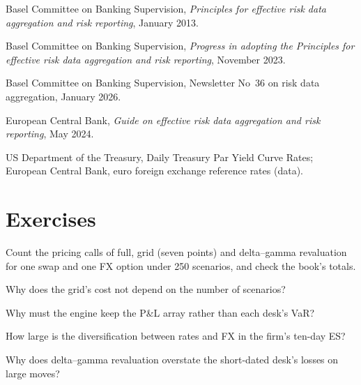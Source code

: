 \begin{omsources}
\item Basel Committee on Banking Supervision, \emph{Principles for effective risk data aggregation and risk
reporting}, January 2013.
\item Basel Committee on Banking Supervision, \emph{Progress in adopting the Principles for effective risk data
aggregation and risk reporting}, November 2023.
\item Basel Committee on Banking Supervision, Newsletter No~36 on risk data aggregation, January 2026.
\item European Central Bank, \emph{Guide on effective risk data aggregation and risk reporting}, May 2024.
\item US Department of the Treasury, Daily Treasury Par Yield Curve Rates; European Central Bank, euro foreign
exchange reference rates (data).
\end{omsources}

\section{Exercises}

\begin{exercise}[$\star$]\label{exo:rc:build-a-risk-engine:1}
Count the pricing calls of full, grid (seven points) and delta--gamma revaluation for one swap and one FX
option under 250 scenarios, and check the book's totals.
\end{exercise}

\begin{exercise}[$\star$]\label{exo:rc:build-a-risk-engine:2}
Why does the grid's cost not depend on the number of scenarios?
\end{exercise}

\begin{exercise}[$\star$]\label{exo:rc:build-a-risk-engine:3}
Why must the engine keep the P\&L array rather than each desk's VaR?
\end{exercise}

\begin{exercise}[$\star\star$]\label{exo:rc:build-a-risk-engine:4}
How large is the diversification between rates and FX in the firm's ten-day ES?
\end{exercise}

\begin{exercise}[$\star\star$]\label{exo:rc:build-a-risk-engine:5}
Why does delta--gamma revaluation overstate the short-dated desk's losses on large moves?
\end{exercise}

